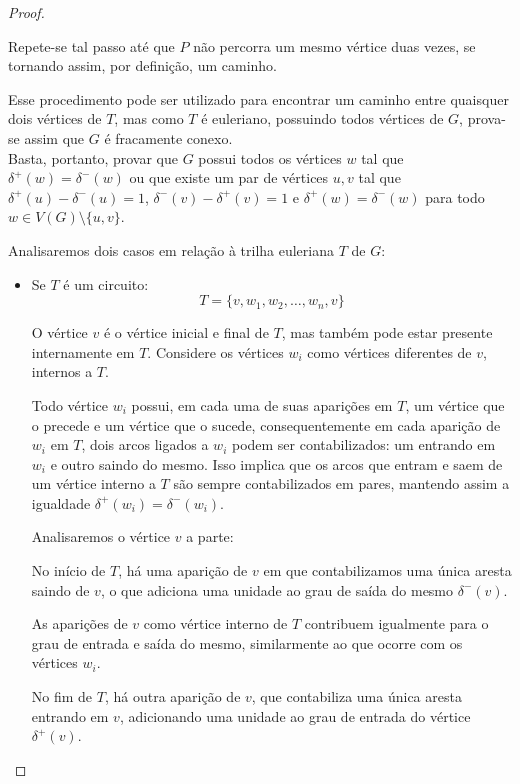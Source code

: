 \documentclass[12pt, a4paper]{article}
\begin{document}
\begin{proof}
\begin{tcolorbox}
            Repete-se tal passo até que $P$ não percorra um mesmo vértice duas vezes, se tornando assim, por definição, um caminho.

        \end{tcolorbox}
    
    Esse procedimento pode ser utilizado para encontrar um caminho entre quaisquer dois vértices de $T$, mas como $T$ é euleriano, possuindo todos vértices de $G$, prova-se assim que $G$ é fracamente conexo. \\

     Basta, portanto, provar que $G$ possui todos os vértices $w$ tal que $\delta^+(w) = \delta^-(w)$ ou que existe um par de vértices $u, v$ tal que $\delta^+(u) - \delta^-(u) = 1$, $\delta^-(v) - \delta^+(v) = 1$ e $\delta^+(w) = \delta^-(w)$ para todo $w \in V(G)\setminus \{u, v\}$.

    Analisaremos dois casos em relação à trilha euleriana $T$ de $G$:

    \begin{itemize}
        \item Se $T$ é um circuito:
            \[
                T  = \{v, w_1, w_2, \dots, w_n, v\}
            \]

            O vértice $v$ é o vértice inicial e final de $T$, mas também pode estar presente internamente em $T$. 
            Considere os vértices $w_i$ como vértices diferentes de $v$, internos a $T$.

            Todo vértice $w_i$ possui, em cada uma de suas aparições em $T$, um vértice que o precede e um vértice que o sucede, consequentemente em cada aparição de $w_i$ em $T$, dois arcos ligados a $w_i$ podem ser contabilizados: um entrando em $w_i$ e outro saindo do mesmo. 
            Isso implica que os arcos que entram e saem de um vértice interno a $T$ são sempre contabilizados em pares, mantendo assim a igualdade $\delta^+(w_i) = \delta^-(w_i)$.

            Analisaremos o vértice $v$ a parte:

            No início de $T$, há uma aparição de $v$ em que contabilizamos uma única aresta saindo de $v$, o que adiciona uma unidade ao grau de saída do mesmo $\delta^-(v)$.

            As aparições de $v$ como vértice interno de $T$ contribuem igualmente para o grau de entrada e saída do mesmo, similarmente ao que ocorre com os vértices $w_i$.

            No fim de $T$, há outra aparição de $v$, que contabiliza uma única aresta entrando em $v$, adicionando uma unidade ao grau de entrada do vértice $\delta^+(v)$.


\end{itemize}
\end{proof}
\end{document}
